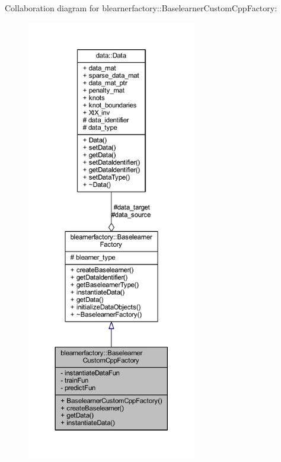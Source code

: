 Collaboration diagram for blearnerfactory\+:\+:Baselearner\+Custom\+Cpp\+Factory\+:\nopagebreak
\begin{figure}[H]
\begin{center}
\leavevmode
\includegraphics[height=550pt]{classblearnerfactory_1_1_baselearner_custom_cpp_factory__coll__graph}
\end{center}
\end{figure}
